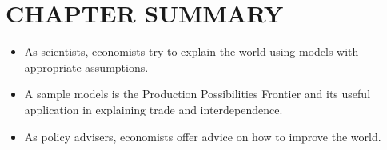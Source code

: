 \documentclass[
]{book}
\begin{document}
\hypertarget{chapter-summary-1}{%
\section{CHAPTER SUMMARY}\label{chapter-summary-1}}

\begin{itemize}
\item
  As scientists, economists try to explain the world using models with appropriate assumptions.
\item
  A sample models is the Production Possibilities Frontier and its useful application in explaining trade and interdependence.
\item
  As policy advisers, economists offer advice on how to improve the world.
\end{itemize}
\end{document}
